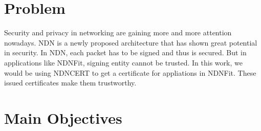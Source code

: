 \documentclass[a0,portrait]{poster}
\begin{document}
\begin{multicols}{2} %







\color{SaddleBrown} %
\section*{Problem}
	Security and privacy in networking are gaining more and more attention nowadays. 
	NDN is a newly proposed architecture that has shown great potential in security. 
	In NDN, each packet has to be signed and thus is secured. 
	But in applications like NDNFit, signing entity cannot be trusted.
	In this work, we would be using NDNCERT to get a certificate for appliations in NDNFit.
	These issued certificates make them trustworthy.

\color{DarkSlateGray} %

\section*{Main Objectives}


\end{multicols}
\end{document}
